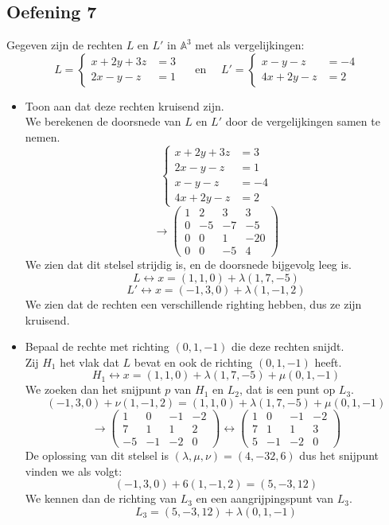 \documentclass[main.tex]{subfiles}
\begin{document}
\subsection*{Oefening 7}
Gegeven zijn de rechten $L$ en $L'$ in $\mathbb{A}^{3}$ met als vergelijkingen:
\[
L = 
\left\{
\begin{array}{cl}
x + 2y + 3z &= 3\\
2x -y -z &= 1    
\end{array}
\right.
\quad\text{ en }\quad
L' = 
\left\{
\begin{array}{cl}
x - y - z &= -4\\
4x +2y -z &= 2
\end{array}
\right.
\]
\begin{itemize}
\item Toon aan dat deze rechten kruisend zijn.\\
We berekenen de doorsnede van $L$ en $L'$ door de vergelijkingen samen te nemen.
\[
\left\{
\begin{array}{cl}
x + 2y + 3z &= 3\\
2x -y -z &= 1\\
x - y - z &= -4\\
4x +2y -z &= 2
\end{array}
\right.
\]
\[
\rightarrow
\begin{pmatrix}
  1 & 2 & 3 & 3\\
  0 &-5 &-7 &-5\\
  0 & 0 & 1 & -20\\
  0 & 0 &-5 & 4
\end{pmatrix}
\]
We zien dat dit stelsel strijdig is, en de doorsnede bijgevolg leeg is.
\[ L \leftrightarrow x = (1,1,0) + \lambda(1,7,-5) \]
\[ L' \leftrightarrow x = (-1,3,0) + \lambda(1,-1,2) \]
We zien dat de rechten een verschillende righting hebben, dus ze zijn kruisend.

\item Bepaal de rechte met richting $(0,1,-1)$ die deze rechten snijdt.\\
Zij $H_{1}$ het vlak dat $L$ bevat en ook de richting $(0,1,-1)$ heeft.
\[ H_{1} \leftrightarrow x = (1,1,0) + \lambda(1,7,-5) + \mu (0,1,-1) \]
We zoeken dan het snijpunt $p$ van $H_{1}$ en $L_{2}$, dat is een punt op $L_{3}$.
\[ (-1,3,0) + \nu(1,-1,2) = (1,1,0) + \lambda(1,7,-5) + \mu (0,1,-1) \]
\[
\rightarrow
\begin{pmatrix}
  1 & 0 &-1 &-2\\
  7 & 1 & 1 & 2\\
  -5 &-1 &-2 & 0
\end{pmatrix}
\leftrightarrow
\begin{pmatrix}
  1 & 0 &-1 &-2\\
  7 & 1 & 1 & 3\\
  5 &-1 &-2 & 0
\end{pmatrix}
\]
De oplossing van dit stelsel is $(\lambda,\mu,\nu) = (4,-32,6)$ dus het snijpunt vinden we als volgt:
\[ (-1,3,0) + 6(1,-1,2) = (5,-3,12) \]
We kennen dan de richting van $L_{3}$ en een aangrijpingspunt van $L_{3}$.
\[ L_{3} = (5,-3,12) + \lambda (0,1,-1) \]
\end{itemize}
\end{document}
